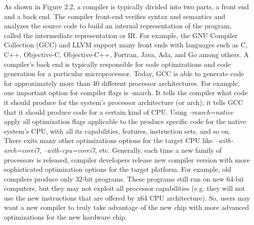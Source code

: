 As shown in Figure 2.2, a compiler is typically divided into two parts, a front end and a back end. The compiler front-end verifies syntax and semantics and analyzes the source code to build an internal representation of the program, called the intermediate representation or IR. For example, the GNU Compiler Collection (GCC) and LLVM support many front ends with languages such as C, C++, Objective-C, Objective-C++, Fortran, Java, Ada, and Go among others. 
A compiler’s back end is typically responsible for code optimizations and code generation for a particular microprocessor. Today, GCC is able to generate code for approximately more than 40 different processor architectures.
For example, one important option for compiler flags is -march. It tells the compiler what code it should produce for the system's processor architecture (or arch); it tells GCC that it should produce code for a certain kind of CPU. Using \textit{-march=native} apply all optimization flags applicable to the produce specific code for the native system's CPU, with all its capabilities, features, instruction sets, and so on. There exits many other optimizations options for the target CPU like \textit{--with-arch=corei7}, \textit{--with-cpu=corei7}, etc.
Generally, each time a new family of processors is released, compiler developers release new compiler version with more sophisticated optimization options for the target platform. For example, old compilers produce only 32-bit programs. These programs still run on new 64-bit computers, but they may not exploit all processor capabilities (e.g. they will not use the new instructions that are offered by x64 CPU architecture). So, users may want a new compiler to truly take advantage of the new chip with more advanced optimizations for the new hardware chip.










